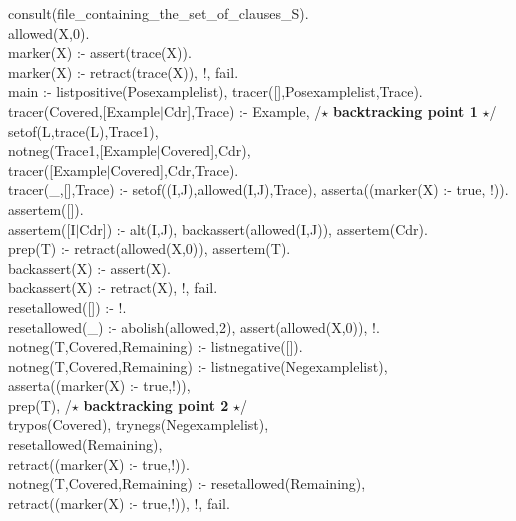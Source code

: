 \small
\normalsize
 
\noindent
consult(file\_containing\_the\_set\_of\_clauses\_S).\\
 
\noindent
allowed(X,0).\\
 
\noindent
marker(X) :- assert(trace(X)).\\
marker(X) :- retract(trace(X)), !, fail.\\
 
\noindent
main :- listpositive(Posexamplelist), tracer([],Posexamplelist,Trace).\\
 
\noindent
tracer(Covered,[Example$\mid$Cdr],Trace) :- Example, 
/$\star$ {\bf backtracking point 1} $\star$/\\
\hspace*{2.3in}setof(L,trace(L),Trace1),\\
\hspace*{2.3in}notneg(Trace1,[Example$\mid$Covered],Cdr),\\
\hspace*{2.3in}tracer([Example$\mid$Covered],Cdr,Trace).\\
tracer(\_,[],Trace) :- setof((I,J),allowed(I,J),Trace),
asserta((marker(X) :- true, !)).\\
 
\noindent
assertem([]).\\
assertem([I$\mid$Cdr]) :- alt(I,J), backassert(allowed(I,J)), assertem(Cdr).\\
 
\noindent
prep(T) :- retract(allowed(X,0)), assertem(T).\\
 
\noindent
backassert(X) :- assert(X).\\
backassert(X) :- retract(X), !, fail.\\
 
\noindent
resetallowed([]) :- !.\\
resetallowed(\_) :- abolish(allowed,2), assert(allowed(X,0)), !.\\
 
\noindent
notneg(T,Covered,Remaining) :- listnegative([]).\\
notneg(T,Covered,Remaining) :- listnegative(Negexamplelist),\\
\hspace*{2.3in}asserta((marker(X) :- true,!)),\\
\hspace*{2.3in} prep(T),
/$\star$ {\bf backtracking point 2} $\star$/\\
\hspace*{2.3in}trypos(Covered), trynegs(Negexamplelist),\\
\hspace*{2.3in}resetallowed(Remaining),\\
\hspace*{2.3in}retract((marker(X) :- true,!)).\\
notneg(T,Covered,Remaining) :- resetallowed(Remaining),\\
\hspace*{2.3in}retract((marker(X) :- true,!)), !, fail.\\
 
